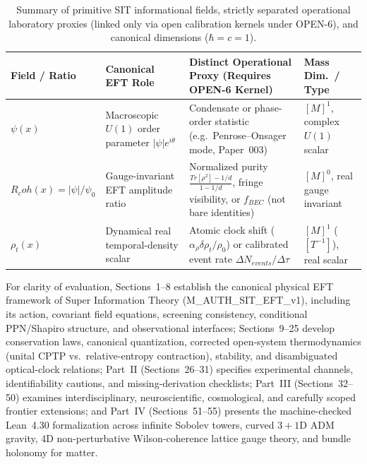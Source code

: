 \documentclass[american,11pt,letterpaper]{article}
\newcommand{\Rcoh}{R_{\mathrm{coh}}}
\def\mathrm#1{#1}%
\def\texttt#1{#1}%
\def\Rcoh{R_coh}%
\begin{document}
\begin{table}[htbp]
\centering
\caption{Summary of primitive SIT informational fields, strictly separated operational laboratory proxies (linked only via open calibration kernels under \texttt{OPEN-6}), and canonical dimensions ($\hbar = c = 1$).}
\label{tab:primitive-fields-summary}
\vspace{0.4em}
\footnotesize
\begin{tabular}{|p{2.9cm}|p{3.9cm}|p{4.3cm}|p{3.3cm}|}
\hline
\textbf{Field / Ratio} & \textbf{Canonical EFT Role} & \textbf{Distinct Operational Proxy (Requires \texttt{OPEN-6} Kernel)} & \textbf{Mass Dim.\ / Type} \\
\hline
$\psi(x)$ & Macroscopic $U(1)$ order parameter $|\psi|e^{i\theta}$ & Condensate or phase-order statistic (e.g.\ Penrose--Onsager mode, Paper~003) & $[M]^1$, complex $U(1)$ scalar \\
$\Rcoh(x) = |\psi|/\psi_0$ & Gauge-invariant EFT amplitude ratio & Normalized purity $\frac{\mathrm{Tr}[\rho^2]-1/d}{1-1/d}$, fringe visibility, or $f_{\mathrm{BEC}}$ (not bare identities) & $[M]^0$, real gauge invariant \\
$\rho_t(x)$ & Dynamical real temporal-density scalar & Atomic clock shift ($\alpha_\rho \delta\rho_t/\rho_0$) or calibrated event rate $\Delta N_{\mathrm{events}}/\Delta\tau$ & $[M]^1$ ($[T^{-1}]$), real scalar \\
\hline
\end{tabular}
\end{table}

For clarity of evaluation, Sections~1--8 establish the canonical physical EFT framework of Super Information Theory (\texttt{M\_AUTH\_SIT\_EFT\_v1}), including its action, covariant field equations, screening consistency, conditional PPN/Shapiro structure, and observational interfaces; Sections~9--25 develop conservation laws, canonical quantization, corrected open-system thermodynamics (unital CPTP vs.\ relative-entropy contraction), stability, and disambiguated optical-clock relations; Part~II (Sections~26--31) specifies experimental channels, identifiability cautions, and missing-derivation checklists; Part~III (Sections~32--50) examines interdisciplinary, neuroscientific, cosmological, and carefully scoped frontier extensions; and Part~IV (Sections~51--55) presents the machine-checked Lean~4.30 formalization across infinite Sobolev towers, curved $3+1$D ADM gravity, 4D non-perturbative Wilson-coherence lattice gauge theory, and bundle holonomy for matter.
\end{document}
